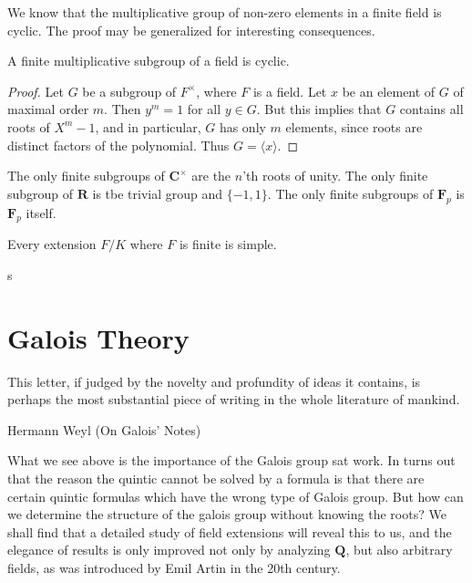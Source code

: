 We know that the multiplicative group of non-zero elements in a finite field is cyclic. The proof may be generalized for interesting consequences.

\begin{theorem}
    A finite multiplicative subgroup of a field is cyclic.
\end{theorem}
\begin{proof}
    Let $G$ be a subgroup of $F^\times$, where $F$ is a field. Let $x$ be an element of $G$ of maximal order $m$. Then $y^m = 1$ for all $y \in G$. But this implies that $G$ contains all roots of $X^m - 1$, and in particular, $G$ has only $m$ elements, since roots are distinct factors of the polynomial. Thus $G = \langle x \rangle$.
\end{proof}

\begin{example}
    The only finite subgroups of $\mathbf{C}^\times$ are the $n$'th roots of unity. The only finite subgroup of $\mathbf{R}$ is tbe trivial group and $\{ -1, 1 \}$. The only finite subgroups of $\mathbf{F}_p$ is $\mathbf{F}_p$ itself.
\end{example}

\begin{corollary}
    Every extension $F/K$ where $F$ is finite is simple.
\end{corollary}

\begin{corollary}
    s
\end{corollary}



\chapter{Galois Theory}

\epigraph{This letter, if judged by the novelty and profundity of ideas it contains, is perhaps the most substantial piece of writing in the whole literature of mankind.}{Hermann Weyl (On Galois' Notes)}



What we see above is the importance of the Galois group sat work. In turns out that the reason the quintic cannot be solved by a formula is that there are certain quintic formulas which have the wrong type of Galois group. But how can we determine the structure of the galois group without knowing the roots? We shall find that a detailed study of field extensions will reveal this to us, and the elegance of results is only improved not only by analyzing $\mathbf{Q}$, but also arbitrary fields, as was introduced by Emil Artin in the 20th century.

